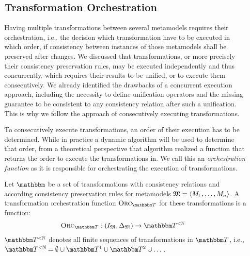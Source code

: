 \subsection{Transformation Orchestration}

Having multiple transformations between several metamodels requires their orchestration, i.e., the decision which transformation have to be executed in which order, if consistency between instances of those metamodels shall be preserved after changes.
We discussed that transformations, or more precisely their \glspl{consistency preservation rule}, may be executed independently and thus concurrently, which requires their results to be unified, or to execute them consecutively.
We already identified the drawbacks of a concurrent execution approach, including the necessity to define unification operators and the missing guarantee to be consistent to any consistency relation after such a unification.
This is why we follow the approach of consecutively executing transformations.

To consecutively execute transformations, an order of their execution has to be determined.
While in practice a dynamic algorithm will be used to determine that order, from a theoretical perspective that algorithm realized a function that returns the order to execute the transformations in.
We call this an \emph{orchestration function} as it is responsible for orchestrating the execution of transformations.

\begin{definition}
    Let $\transformationset{}$ be a set of transformations with \glspl{consistency relation} and according \glspl{consistency preservation rule} for metamodels $\mathfrak{M} = \langle M_{1}, \dots, M_{n} \rangle$.
    A transformation \gls{orchestration function} $\orcfunction{\transformationset{T}}$ for these transformations is a function:
    \begin{align*}
        &
        \orcfunction{\transformationset{T}} : (\metamodeltupleinstanceset{M}, \changeuniverse{\metamodeltuple{M}}) \rightarrow \transformationset{T}^{< \mathbb{N}}
    \end{align*}
    $\transformationset{T}^{< \mathbb{N}}$ denotes all finite sequences of transformations in $\transformationset{T}$, i.e., $\transformationset{T}^{< \mathbb{N}} = \emptyset \cup \transformationset{T}^1 \cup \transformationset{T}^2 \cup \dots$.
\end{definition}

